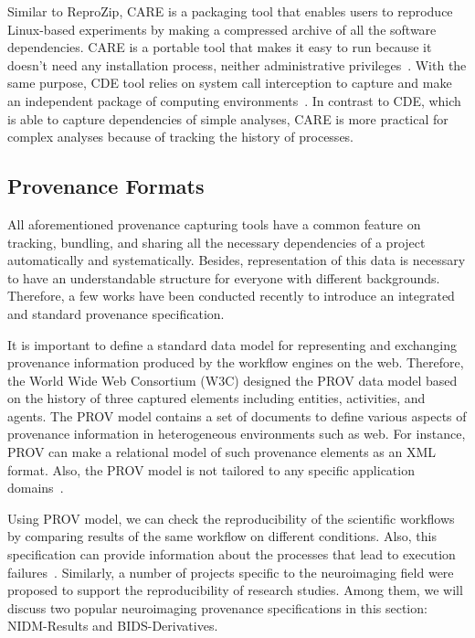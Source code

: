 Similar to ReproZip, CARE is a packaging tool 
that enables users to reproduce Linux-based experiments by making a 
compressed archive of all the software dependencies. CARE is a portable 
tool that makes it easy to run because it doesn't need any 
installation process, neither administrative 
privileges~\cite{janin2014care}. With the same purpose, CDE tool 
relies on system call interception to capture and make an independent 
package of computing environments~\cite{guo2012cde}. In contrast to CDE, 
which is able to capture dependencies of simple analyses, CARE is more 
practical for complex analyses because of tracking the history of 
processes. 


\subsection{Provenance Formats}

All aforementioned provenance capturing tools have a common feature on 
tracking, bundling, and sharing all the necessary dependencies of 
a project automatically and systematically. Besides, representation of 
this data is necessary to have an understandable structure for everyone 
with different backgrounds. Therefore, a few works have been conducted 
recently to introduce an integrated and standard provenance 
specification. 

It is important to define a standard data model for representing and 
exchanging provenance information produced by the workflow engines on 
the web. Therefore, the World Wide Web Consortium (W3C) designed the 
PROV data model based on the history of three captured elements 
including entities, activities, and agents. The PROV model contains a 
set of documents to define various aspects of provenance information in 
heterogeneous environments such as web. For instance, PROV can make a 
relational model of such provenance elements as an XML format. Also, 
the PROV model is not tailored to any specific application 
domains~\cite{cheney2012principles, missier2013w3c}.

Using PROV model, we can check the reproducibility of the scientific 
workflows by comparing results of the same workflow on different 
conditions. Also, this specification can provide information about the 
processes that lead to execution failures~\cite{missier2013w3c}. 
Similarly, a number of projects specific to the neuroimaging field were 
proposed to support the reproducibility of research studies. Among 
them, we will discuss two popular neuroimaging provenance specifications 
in this section: NIDM-Results and BIDS-Derivatives. 

